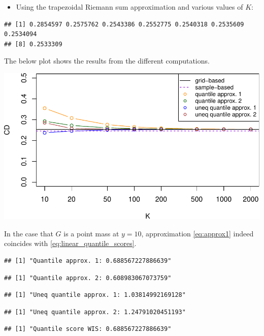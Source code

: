 \documentclass[
]{article}
\providecommand{\tightlist}{%
  \setlength{\itemsep}{0pt}\setlength{\parskip}{0pt}}
\begin{document}
\begin{itemize}
\tightlist
\item
  Using the trapezoidal Riemann sum approximation and various values of
  \(K\):
\end{itemize}

\begin{verbatim}
## [1] 0.2854597 0.2575762 0.2543386 0.2552775 0.2540318 0.2535609 0.2534094
## [8] 0.2533309
\end{verbatim}

The below plot shows the results from the different computations.

\includegraphics{cd_approx_2_files/figure-latex/unnamed-chunk-10-1.pdf}

In the case that \(G\) is a point mass at \(y=10\), approximation
\eqref{eq:approx1} indeed coincides with
\eqref{eq:linear_quantile_scores}.

\begin{verbatim}
## [1] "Quantile approx. 1: 0.688567227886639"
\end{verbatim}

\begin{verbatim}
## [1] "Quantile approx. 2: 0.608983067073759"
\end{verbatim}

\begin{verbatim}
## [1] "Uneq quantile approx. 1: 1.03814992169128"
\end{verbatim}

\begin{verbatim}
## [1] "Uneq quantile approx. 2: 1.24791020451193"
\end{verbatim}

\begin{verbatim}
## [1] "Quantile score WIS: 0.688567227886639"
\end{verbatim}
\end{document}
